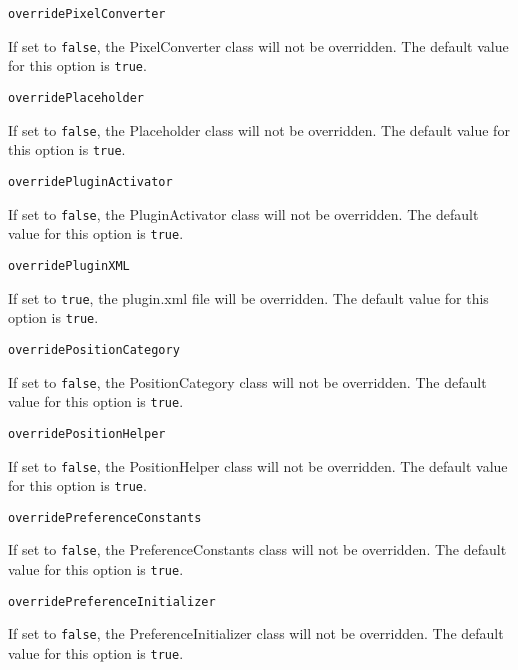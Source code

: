 \noindent\texttt{overridePixelConverter}
\begin{myindentpar}{1cm}
If set to \texttt{false}, the PixelConverter class will not be overridden. The default value for this option is \texttt{true}.
\end{myindentpar}

\noindent\texttt{overridePlaceholder}
\begin{myindentpar}{1cm}
If set to \texttt{false}, the Placeholder class will not be overridden. The default value for this option is \texttt{true}.
\end{myindentpar}

\noindent\texttt{overridePluginActivator}
\begin{myindentpar}{1cm}
If set to \texttt{false}, the PluginActivator class will not be overridden. The default value for this option is \texttt{true}.
\end{myindentpar}

\noindent\texttt{overridePluginXML}
\begin{myindentpar}{1cm}
If set to \texttt{true}, the plugin.xml file will be overridden. The default value for this option is \texttt{true}.
\end{myindentpar}

\noindent\texttt{overridePositionCategory}
\begin{myindentpar}{1cm}
If set to \texttt{false}, the PositionCategory class will not be overridden. The default value for this option is \texttt{true}.
\end{myindentpar}

\noindent\texttt{overridePositionHelper}
\begin{myindentpar}{1cm}
If set to \texttt{false}, the PositionHelper class will not be overridden. The default value for this option is \texttt{true}.
\end{myindentpar}

\noindent\texttt{overridePreferenceConstants}
\begin{myindentpar}{1cm}
If set to \texttt{false}, the PreferenceConstants class will not be overridden. The default value for this option is \texttt{true}.
\end{myindentpar}

\noindent\texttt{overridePreferenceInitializer}
\begin{myindentpar}{1cm}
If set to \texttt{false}, the PreferenceInitializer class will not be overridden. The default value for this option is \texttt{true}.
\end{myindentpar}

